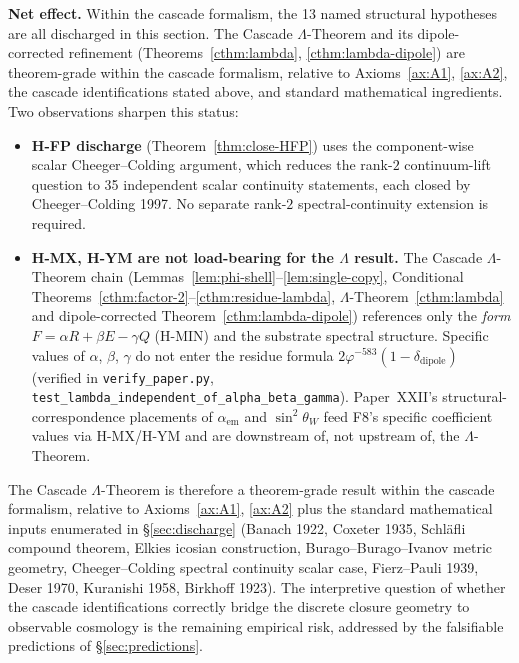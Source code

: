 \documentclass[11pt]{article}
\theoremstyle{plain}
\theoremstyle{definition}
\theoremstyle{remark}
\begin{document}
\textbf{Net effect.} Within the cascade formalism, the 13 named structural hypotheses are all discharged in this section. The Cascade $\Lambda$-Theorem and its dipole-corrected refinement (Theorems~\ref{cthm:lambda}, \ref{cthm:lambda-dipole}) are theorem-grade within the cascade formalism, relative to Axioms~\ref{ax:A1}, \ref{ax:A2}, the cascade identifications stated above, and standard mathematical ingredients. Two observations sharpen this status:
\begin{itemize}[leftmargin=2em]
\item \textbf{H-FP discharge} (Theorem~\ref{thm:close-HFP}) uses the component-wise scalar Cheeger--Colding argument, which reduces the rank-$2$ continuum-lift question to 35 independent scalar continuity statements, each closed by Cheeger--Colding 1997. No separate rank-$2$ spectral-continuity extension is required.
\item \textbf{H-MX, H-YM are not load-bearing for the $\Lambda$ result.} The Cascade $\Lambda$-Theorem chain (Lemmas~\ref{lem:phi-shell}--\ref{lem:single-copy}, Conditional Theorems~\ref{cthm:factor-2}--\ref{cthm:residue-lambda}, $\Lambda$-Theorem~\ref{cthm:lambda} and dipole-corrected Theorem~\ref{cthm:lambda-dipole}) references only the \emph{form} $F = \alpha R + \beta E - \gamma Q$ (H-MIN) and the substrate spectral structure. Specific values of $\alpha$, $\beta$, $\gamma$ do not enter the residue formula $2\varphi^{-583}(1 - \delta_\mathrm{dipole})$ (verified in \texttt{verify\_paper.py}, \texttt{test\_lambda\_independent\_of\_alpha\_beta\_gamma}). Paper~XXII's structural-correspondence placements of $\alpha_\mathrm{em}$ and $\sin^2\theta_W$ feed F8's specific coefficient values via H-MX/H-YM and are downstream of, not upstream of, the $\Lambda$-Theorem.
\end{itemize}
The Cascade $\Lambda$-Theorem is therefore a theorem-grade result within the cascade formalism, relative to Axioms~\ref{ax:A1}, \ref{ax:A2} plus the standard mathematical inputs enumerated in \S\ref{sec:discharge} (Banach 1922, Coxeter 1935, Schl\"afli compound theorem, Elkies icosian construction, Burago--Burago--Ivanov metric geometry, Cheeger--Colding spectral continuity scalar case, Fierz--Pauli 1939, Deser 1970, Kuranishi 1958, Birkhoff 1923). The interpretive question of whether the cascade identifications correctly bridge the discrete closure geometry to observable cosmology is the remaining empirical risk, addressed by the falsifiable predictions of \S\ref{sec:predictions}.

\end{document}
